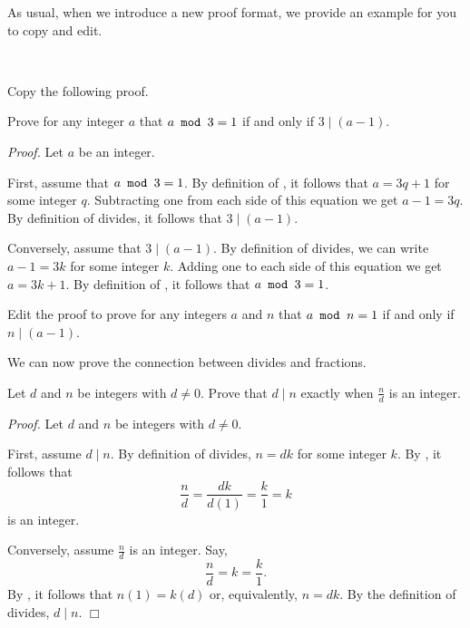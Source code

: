 As usual, when we introduce a new proof format, we provide an example for you to copy and edit.

\begin{act}
\label{act_iff_proof}
~    
    \begin{actpart}
        \item Copy the following proof.

        Prove for any integer $a$ that $a \texttt{ mod } 3 = 1$ if and only if $3 \mid (a-1)$.

        \emph{Proof.}  Let $a$ be an integer.

        First, assume that $a \texttt{ mod } 3 = 1$. By definition of , it follows that $a = 3q +1$ for some integer $q$.  Subtracting one from each side of this equation we get $a-1 = 3q$.  By definition of divides, it follows that $3 \mid (a-1)$.

        Conversely, assume that $3 \mid (a-1)$. By definition of divides, we can write $a-1=3k$ for some integer $k$.  Adding one to each side of this equation we get $a = 3k+1$.  By definition of , it follows that $a \texttt{ mod } 3 = 1$.

        \item Edit the proof to prove for any integers $a$ and $n$ that $a \texttt{ mod } n = 1$ if and only if $n \mid (a-1)$.
    \end{actpart}
\end{act}



We can now prove the connection between divides and fractions.

\begin{exam} 
\label{exam_fractions_divides}
    Let $d$ and $n$ be integers with $d \neq 0$. Prove that $d \mid n$ exactly when $\frac{n}{d}$ is an integer.
    
        \emph{Proof.}  Let $d$ and $n$ be integers with $d \neq 0$.
        
        \quad First, assume $d \mid n$. By definition of divides, $n=dk$ for some integer $k$.  By , it follows that
            $$\frac{n}{d} = \frac{dk}{d(1)} = \frac{k}{1} = k$$
        is an integer.
            
        \quad Conversely, assume $\frac{n}{d}$ is an integer.  Say, 
            $$\frac{n}{d} = k = \frac{k}{1}.$$  
        By , it follows that $n(1) = k(d)$ or, equivalently, $n=dk$.  By the definition of divides, $d \mid n$. \hfill $\Box$          
\end{exam}

